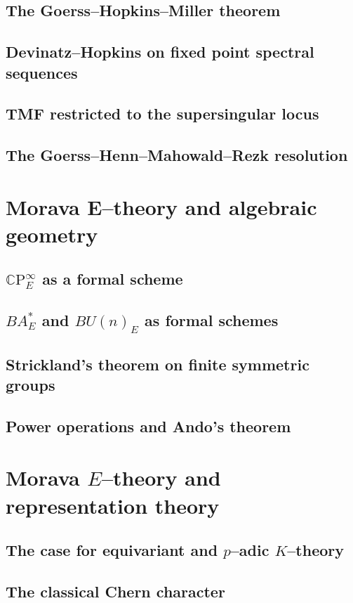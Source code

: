    \subsection*{The Goerss--Hopkins--Miller theorem}
    \subsection*{Devinatz--Hopkins on fixed point spectral sequences}
    \subsection*{TMF restricted to the supersingular locus}
    \subsection*{The Goerss--Henn--Mahowald--Rezk resolution}

\section*{Morava E--theory and algebraic geometry}
    \subsection*{$\mathbb C \mathrm P^\infty_E$ as a formal scheme}
    \subsection*{$BA^*_E$ and $BU(n)_E$ as formal schemes}
    \subsection*{Strickland's theorem on finite symmetric groups}
    \subsection*{Power operations and Ando's theorem}

\section*{Morava $E$--theory and representation theory}
    \subsection*{The case for equivariant and $p$--adic $K$--theory}
    \subsection*{The classical Chern character}
